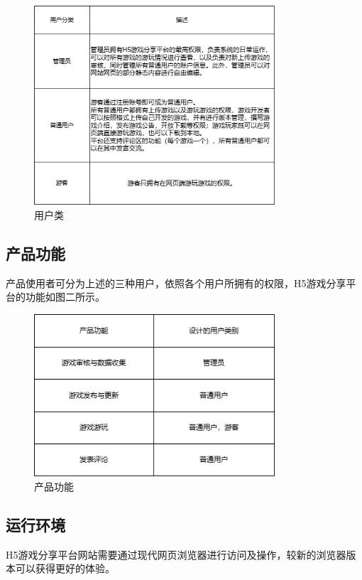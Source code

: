 \documentclass[12pt]{ctexart} %
\begin{document}
\begin{figure}[htbp]
  \centering
  \includegraphics[width=0.8\textwidth]{user_class.png}
  \caption{用户类}
  \label{f1}
\end{figure}


\subsection{产品功能}
产品使用者可分为上述的三种用户，依照各个用户所拥有的权限，H5游戏分享平台的功能如图二所示。

\begin{figure}[htbp]
  \centering
  \includegraphics[width=0.8\textwidth]{function.png}
  \caption{产品功能}
  \label{f2}
\end{figure}

\subsection{运行环境}
H5游戏分享平台网站需要通过现代网页浏览器进行访问及操作，较新的浏览器版本可以获得更好的体验。
\end{document}
